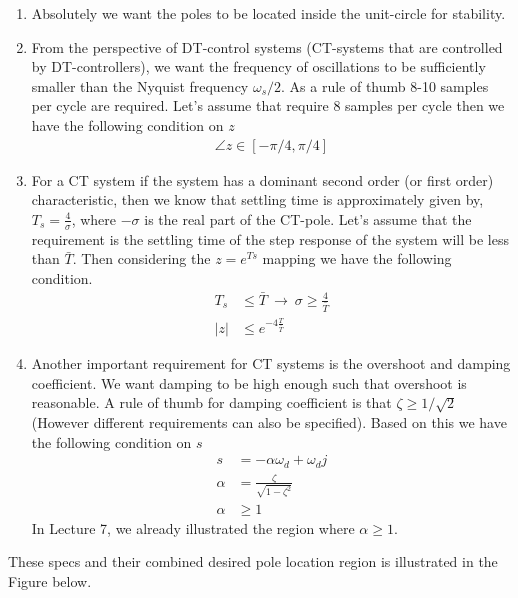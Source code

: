 \documentclass[twoside]{article}
\begin{document}
\begin{enumerate}
  \item Absolutely we want the poles to be located inside the
    unit-circle for stability. 
  \item From the perspective of DT-control systems (CT-systems that are controlled by
    DT-controllers), we want the frequency of oscillations to 
    be sufficiently smaller than the Nyquist frequency $\omega_s / 2$.
    As a rule of thumb 8-10 samples per cycle are required. 
    Let's assume that require 8 samples per cycle then we have the
    following condition on $z$
%
     \begin{align*}
      \angle z \in [-\pi/4 , \pi/4]
     \end{align*}
%
    \item For a CT system if the system has a dominant second order
      (or first order) characteristic, then we know that settling time
      is approximately given by, $T_s = \frac{4}{\sigma}$, where
      $-\sigma$ is the real part of the CT-pole. Let's assume that
      the requirement is the settling time of the step response of the
     system will be less than $\bar{T}$. Then considering the $z =
     e^{Ts}$ mapping we have the following condition.
%
     \begin{align*}
       T_s &\leq \bar{T} \ \rightarrow \ \sigma \geq \frac{4}{\bar{T}}
       \\
       | z | &\leq e^{-4 \frac{T}{\bar{T}}}  
     \end{align*}
%
   \item Another important requirement for CT systems is the overshoot
     and damping coefficient. We want damping to be high enough such 
     that overshoot is reasonable. A rule of thumb for damping
     coefficient is that $\zeta \geq 1/\sqrt{2}$ (However different 
    requirements can also be specified). Based on this we have the
    following condition on $s$
%
     \begin{align*}
       s &= -\alpha \omega_d + \omega_d j 
           \\
       \alpha &= \frac{\zeta}{\sqrt{1 - \zeta^2}}
                \\
       \alpha &\geq 1
     \end{align*}
%
 In Lecture 7, we already illustrated the region where $\alpha \geq
 1$.
\end{enumerate}

These specs and their combined desired pole location region is
illustrated in the Figure below.
\end{document}
